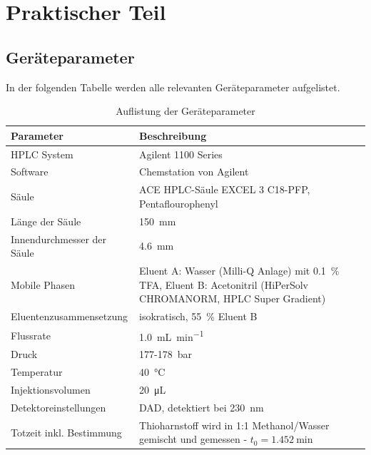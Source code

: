 \section{Praktischer Teil}
  
  \subsection{Geräteparameter}
    
    In der folgenden Tabelle werden alle relevanten Geräteparameter aufgelistet. 
    
    \begin{table}[H]
      \centering
      \caption[Auflistung der Geräteparameter, Quelle: Autor]{Auflistung der Geräteparameter}
      
      \label{tab:Gerateparameter}
      \begin{tabular}{@{}l|p{7cm}l@{}}
        \toprule
        Parameter & Beschreibung \\ \midrule
          HPLC System & Agilent 1100 Series \\
          Software & Chemstation von Agilent \\
          Säule & ACE HPLC-Säule EXCEL 3 C18-PFP, Pentaflourophenyl \\ 
          Länge der Säule & \SI[mode=text]{150}{\milli\meter} \\
          Innendurchmesser der Säule & \SI[mode=text]{4.6}{\milli\meter} \\
          Mobile Phasen & Eluent A: Wasser (Milli-Q Anlage) mit \SI[mode=text]{0.1}{\percent} TFA, Eluent B: Acetonitril (HiPerSolv CHROMANORM, HPLC Super Gradient) \\ 
          Eluentenzusammensetzung & isokratisch, \SI[mode=text]{55}{\percent} Eluent B \\
          Flussrate & \SI[mode=text]{1.0}{\milli\liter\per\minute} \\
          Druck & 177-\SI[mode=text]{178}{bar} \\
          Temperatur & \SI[mode=text]{40}{\degreeCelsius} \\
          Injektionsvolumen & \SI[mode=text]{20}{\micro\liter} \\
          Detektoreinstellungen & DAD, detektiert bei \SI[mode=text]{230}{\nano\meter} \\ 
          Totzeit inkl. Bestimmung & Thioharnstoff wird in 1:1 Methanol/Wasser gemischt und gemessen - $t_0 = \SI[mode=text]{1.452}{\minute}$ \\ \bottomrule
      \end{tabular}
    \end{table}
  
